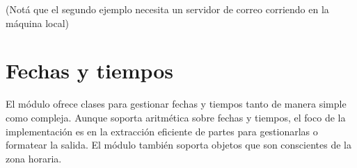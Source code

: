 \documentclass[a5paper,10pt,spanish]{sphinxmanual}
\begin{document}
\sphinxAtStartPar
(Notá que el segundo ejemplo necesita un servidor de correo corriendo en la máquina local)


\section{Fechas y tiempos}
\label{\detokenize{tutorial/stdlib:dates-and-times}}\label{\detokenize{tutorial/stdlib:tut-dates-and-times}}
\sphinxAtStartPar
El módulo  ofrece clases para gestionar fechas y tiempos tanto de manera simple como compleja.  Aunque soporta aritmética sobre fechas y tiempos, el foco de la implementación es en la extracción eficiente de partes para gestionarlas o formatear la salida.  El módulo también soporta objetos que son conscientes de la zona horaria.

\begin{sphinxVerbatim}[commandchars=\\\{\}]
   
  

    
    
\end{sphinxVerbatim}
\end{document}
